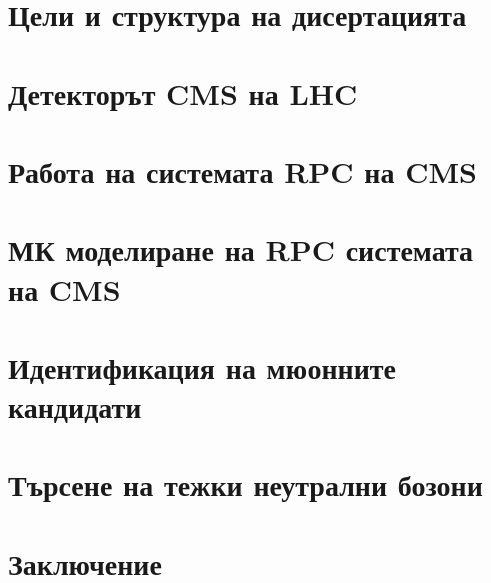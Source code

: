 \documentclass[8pt,a5paper]{report}
\begin{document}


\tableofcontents
\chapter{Цели и структура на дисертацията}

\chapter{Детекторът CMS на LHC}


\chapter{Работа на системата RPC на CMS}

\chapter{МК моделиране на RPC системата на CMS}

\chapter{Идентификация на мюонните кандидати}

\chapter{Търсене на тежки неутрални бозони}

\chapter{Заключение}

%

%
\end{document}
